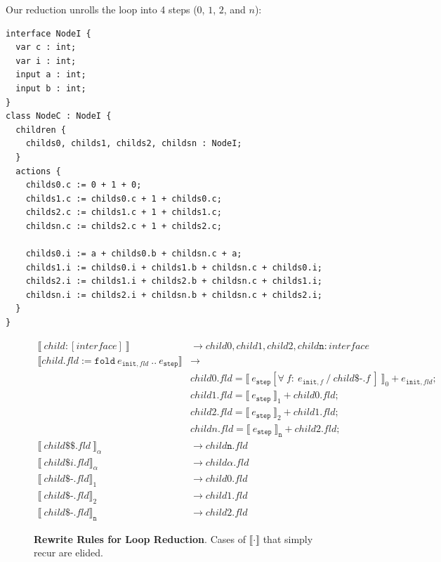 Our reduction unrolls the loop into 4 steps ($0$, $1$, $2$, and $n$):

\begin{lstlisting}[mathescape]
interface NodeI {
  var c : int;
  var i : int;
  input a : int;
  input b : int;
}
class NodeC : NodeI {
  children {  
    childs0, childs1, childs2, childsn : NodeI;
  }
  actions {   
    childs0.c := 0 + 1 + 0;
    childs1.c := childs0.c + 1 + childs0.c;
    childs2.c := childs1.c + 1 + childs1.c;
    childsn.c := childs2.c + 1 + childs2.c;

    childs0.i := a + childs0.b + childsn.c + a;
    childs1.i := childs0.i + childs1.b + childsn.c + childs0.i;
    childs2.i := childs1.i + childs2.b + childsn.c + childs1.i;
    childsn.i := childs2.i + childsn.b + childsn.c + childs2.i;
  }
}        
\end{lstlisting}


\begin{figure}
\begin{align*}
\llbracket ~child : [ interface ] ~\rrbracket &\rightarrow child0, child1, child2, child \texttt{n} : interface 
\\
\llbracket child.fld := \texttt{fold} ~ e_{\texttt{init},fld} ~ .. ~ e_\texttt{step} \rrbracket &\rightarrow 
\\
& child0.fld = \llbracket~e_\texttt{step}[\forall ~f:  ~ e_{\texttt{init},f} ~/~ child\$\texttt{-}.f~]~\rrbracket_0 + e_{\texttt{init},fld}; 
\\
& child1.fld = \llbracket~e_\texttt{step}~\rrbracket_1 + child0.fld;
\\
& child2.fld = \llbracket~e_\texttt{step}~\rrbracket_2 + child1.fld; 
\\
& childn.fld = \llbracket~e_\texttt{step}~\rrbracket_\texttt{n} + child2.fld;
\\
\llbracket ~child\$\$.fld ~\rrbracket_\alpha &\rightarrow child \texttt{n}. fld
\\
\llbracket ~child\$i.fld \rrbracket_\alpha & \rightarrow child\alpha.fld
\\
\llbracket ~child\$\texttt{-}.fld \rrbracket_1 & \rightarrow child0.fld
\\
\llbracket ~child\$\texttt{-}.fld \rrbracket_2 & \rightarrow child1.fld
\\
\llbracket ~child\$\texttt{-}.fld \rrbracket_\texttt{n} & \rightarrow child2.fld
\end{align*}
\caption{\textbf{Rewrite Rules for Loop Reduction}. Cases of $\llbracket \cdot \rrbracket$ that simply recur are elided.}
\label{fig:loopreduction}
\end{figure}

